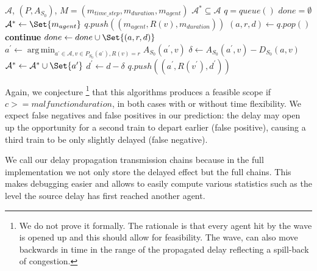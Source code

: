 \documentclass{article}
\DeclareMathOperator*{\argmin}{arg\,min}
\begin{document}
\begin{algorithm}
	\caption{$changed\_transmission\_chains$} \label{algo:transmission_chains}
	\begin{algorithmic}[1]
		\Require $\mathcal{A}$, $(P,A_{S_0})$, $M=(m_{time\_step},m_{duration},m_{agent})$
	    \Ensure $\mathcal{A}^* \subseteq \mathcal{A}$
	    \State $q = queue()$
	    \State $done = \emptyset$
	    \State $\mathcal{A}^* \leftarrow \Set{m_{agent}}$
	        \State $q.push((m_{agent},R(v),m_{duration}))$
	    \EndFor
            \State $(a,r,d) \leftarrow q.pop()$
                \State \textbf{continue}
            \EndIf
            \State $done \leftarrow done \cup \Set{(a,r,d)}$
            \State $a^\prime \leftarrow \argmin_{a^\prime \in \mathcal{A}, v \in P_{S_0}(a^\prime), R(v)=r} A_{S_0}(a^\prime,v)$
            \State $\delta \leftarrow A_{S_0}(a^\prime,v) - D_{S_0}(a,v)$
                \State $\mathcal{A}^* \leftarrow \mathcal{A}^* \cup \Set{a^\prime}$
                \State $d^\prime \leftarrow d-\delta$
    	            \State $q.push((a^\prime,R(v^\prime),d^\prime))$
    	        \EndFor
            \EndIf{}

	    \EndWhile

	\end{algorithmic}
\end{algorithm}





Again, we conjecture \footnote{We do not prove it formally. The rationale is that every agent hit by the wave is opened up and this should allow for feasibility. The wave, can also move backwards in time in the range of the propagated delay reflecting a spill-back of congestion.} that this algorithms produces a feasible scope if $c >= malfunction duration$, in both cases with or without time flexibility.
%
We expect false negatives and false positives in our prediction: the delay may open up the opportunity for a second train to depart earlier (false positive), causing a third train to be only slightly delayed (false negative).


We call our delay propagation transmission chains because in the full implementation we not only store the delayed effect but the full chains. This makes debugging easier and allows to easily compute various statistics such as the level the source delay has first reached another agent.
\end{document}
